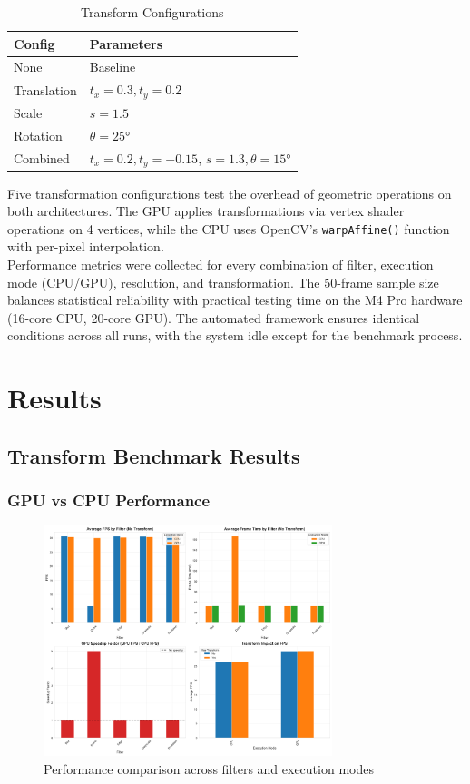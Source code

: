\documentclass[12pt,a4paper]{article}
\begin{document}
\newpage
\begin{table}
\centering
\caption{Transform Configurations}
\label{tab:transforms}
\begin{tabular}{lp{5cm}}
\toprule
\textbf{Config} & \textbf{Parameters} \\
\midrule
None & Baseline \\
Translation & $t_x = 0.3, t_y = 0.2$ \\
Scale & $s = 1.5$ \\
Rotation & $\theta = 25°$ \\
Combined & $t_x = 0.2, t_y = -0.15$, $s = 1.3, \theta = 15°$ \\
\bottomrule
\end{tabular}
\end{table}
Five transformation configurations test the overhead of geometric operations on both architectures. The GPU applies transformations via vertex shader operations on 4 vertices, while the CPU uses OpenCV's \texttt{warpAffine()} function with per-pixel interpolation.
\\
Performance metrics were collected for every combination of filter, execution mode (CPU/GPU), resolution, and transformation. The 50-frame sample size balances statistical reliability with practical testing time on the M4 Pro hardware (16-core CPU, 20-core GPU). The automated framework ensures identical conditions across all runs, with the system idle except for the benchmark process.

\section{Results}

\subsection{Transform Benchmark Results}

\subsubsection{GPU vs CPU Performance}

\begin{figure}[H]
    \centering
    \includegraphics[width=0.75\textwidth]{../data/plots/performance_comparison_transforms.png}
    \caption{Performance comparison across filters and execution modes}
    \label{fig:transform_comparison}
\end{figure}
\end{document}
